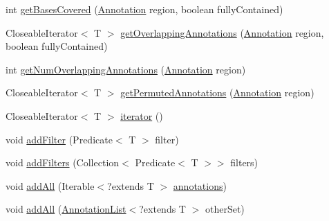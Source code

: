 \begin{DoxyCompactItemize}
\item 
int \hyperlink{classumms_1_1core_1_1annotation_1_1_annotation_list_3_01_t_01extends_01_annotation_01_4_aee85b7f16327c1a40a143042c76d133c}{get\+Bases\+Covered} (\hyperlink{interfaceumms_1_1core_1_1annotation_1_1_annotation}{Annotation} region, boolean fully\+Contained)
\item 
Closeable\+Iterator$<$ T $>$ \hyperlink{classumms_1_1core_1_1annotation_1_1_annotation_list_3_01_t_01extends_01_annotation_01_4_ab6327322586c8fae041be25cf91facb1}{get\+Overlapping\+Annotations} (\hyperlink{interfaceumms_1_1core_1_1annotation_1_1_annotation}{Annotation} region, boolean fully\+Contained)
\item 
int \hyperlink{classumms_1_1core_1_1annotation_1_1_annotation_list_3_01_t_01extends_01_annotation_01_4_abdda73dbcc304eb45a3c7b63ed115d77}{get\+Num\+Overlapping\+Annotations} (\hyperlink{interfaceumms_1_1core_1_1annotation_1_1_annotation}{Annotation} region)
\item 
Closeable\+Iterator$<$ T $>$ \hyperlink{classumms_1_1core_1_1annotation_1_1_annotation_list_3_01_t_01extends_01_annotation_01_4_a35723c6193710912989fdd204d40e3f1}{get\+Permuted\+Annotations} (\hyperlink{interfaceumms_1_1core_1_1annotation_1_1_annotation}{Annotation} region)
\item 
Closeable\+Iterator$<$ T $>$ \hyperlink{classumms_1_1core_1_1annotation_1_1_annotation_list_3_01_t_01extends_01_annotation_01_4_af0a29e6cf7a93ac69b3470fd966812b0}{iterator} ()
\item 
void \hyperlink{classumms_1_1core_1_1annotation_1_1_annotation_list_3_01_t_01extends_01_annotation_01_4_a388bd285183fb5e3ef9a8044f501711e}{add\+Filter} (Predicate$<$ T $>$ filter)
\item 
void \hyperlink{classumms_1_1core_1_1annotation_1_1_annotation_list_3_01_t_01extends_01_annotation_01_4_a6cd01f29fb7018a332405efb17302dbe}{add\+Filters} (Collection$<$ Predicate$<$ T $>$$>$ filters)
\item 
void \hyperlink{classumms_1_1core_1_1annotation_1_1_annotation_list_3_01_t_01extends_01_annotation_01_4_a1085e1c59dfea192637f7f2ee50dba2c}{add\+All} (Iterable$<$?extends T $>$ \hyperlink{classumms_1_1core_1_1annotation_1_1_annotation_list_3_01_t_01extends_01_annotation_01_4_a0822523251b80ee321b29730ecdc05d2}{annotations})
\item 
void \hyperlink{classumms_1_1core_1_1annotation_1_1_annotation_list_3_01_t_01extends_01_annotation_01_4_a27f25962b5d3b5955f7fc23a058eb56f}{add\+All} (\hyperlink{classumms_1_1core_1_1annotation_1_1_annotation_list_3_01_t_01extends_01_annotation_01_4_a9a0da750a3eecca675638691ebac0cbd}{Annotation\+List}$<$?extends T $>$ other\+Set)
$$
\end{DoxyCompactItemize}
